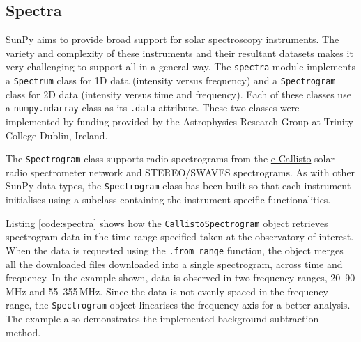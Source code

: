 \subsection{Spectra}\label{sec:spectra}

SunPy aims to provide broad support for solar spectroscopy
instruments.  The variety and complexity of these instruments and
their resultant datasets makes it very challenging to support all in a
general way.  The \texttt{spectra} module implements a
\texttt{Spectrum} class for 1D data (intensity versus frequency) and a
\texttt{Spectrogram} class for 2D data (intensity versus time and
frequency).  Each of these classes use a \texttt{numpy.ndarray} class
as its \texttt{.data} attribute.  These two classes were implemented
by funding provided by the Astrophysics Research Group at Trinity
College Dublin, Ireland.

The \texttt{Spectrogram} class supports radio spectrograms from the 
\href{http://www.e-callisto.org/}{e-Callisto}
solar radio spectrometer network and STEREO/SWAVES spectrograms.
As with other SunPy data types, the \texttt{Spectrogram} class has been
built so that each instrument initialises using a subclass containing the instrument-specific 
functionalities.

Listing \ref{code:spectra} shows how the \texttt{CallistoSpectrogram}
object retrieves spectrogram data in the time range specified taken at
the observatory of interest.  When the data is requested using the
\texttt{.from\_range} function, the object merges all the downloaded
files downloaded into a single spectrogram, across time and frequency.
In the example shown, data is observed in two frequency ranges, 
20--90\,MHz and 55--355\,MHz.  Since the data is not evenly spaced in
the frequency range, the \texttt{Spectrogram} object linearises the
frequency axis for a better analysis.  The example also demonstrates
the implemented background subtraction method.

